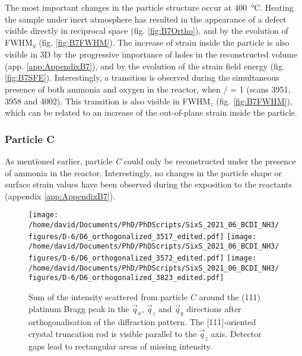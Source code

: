The most important changes in the particle structure occur at \qty{400}{\degreeCelsius}.
Heating the sample under inert atmosphere has resulted in the appearance of a defect visible directly in reciprocal space (fig. \ref{fig:B7Ortho}), and by the evolution of FWHM$_y$ (fig. \ref{fig:B7FWHM}).
The increase of strain inside the particle is also visible in 3D by the progressive importance of holes in the reconstructed volume (app. \ref{app:AppendixB7}), and by the evolution of the strain field energy (fig. \ref{fig:B7SFE}).
Interestingly, a transition is observed during the simultaneous presence of both ammonia and oxygen in the reactor, when / = 1 (scans 3951, 3958 and 4002).
This transition is also visible in FWHM$_z$ (fig. \ref{fig:B7FWHM}), which can be related to an increase of the out-of-plane strain inside the particle.

\subsubsection{Particle C}

As mentioned earlier, particle \textit{C} could only be reconstructed under the presence of ammonia in the reactor.
Interestingly, no changes in the particle shape or surface strain values have been observed during the exposition to the reactants (appendix \ref{app:AppendixB7}).

\begin{figure}[!htb]
    \centering
    \texttt{[image: /home/david/Documents/PhD/PhDScripts/SixS\_2021\_06\_BCDI\_NH3/figures/D-6/D6\_orthogonalized\_3517\_edited.pdf]}
    \texttt{[image: /home/david/Documents/PhD/PhDScripts/SixS\_2021\_06\_BCDI\_NH3/figures/D-6/D6\_orthogonalized\_3572\_edited.pdf]}
    \texttt{[image: /home/david/Documents/PhD/PhDScripts/SixS\_2021\_06\_BCDI\_NH3/figures/D-6/D6\_orthogonalized\_3823\_edited.pdf]}
    \caption{
        Sum of the intensity scattered from particle $C$ around the (111) platinum Bragg peak in the $\vec{q}_x$, $\vec{q}_z$ and $\vec{q}_y$ directions after orthogonalisation of the diffraction pattern.
        The [111]-oriented crystal truncation rod is visible parallel to the $\vec{q}_z$ axis.
        Detector gaps lead to rectangular areas of missing intensity.
    }
    \label{fig:D6Ortho}
\end{figure}

